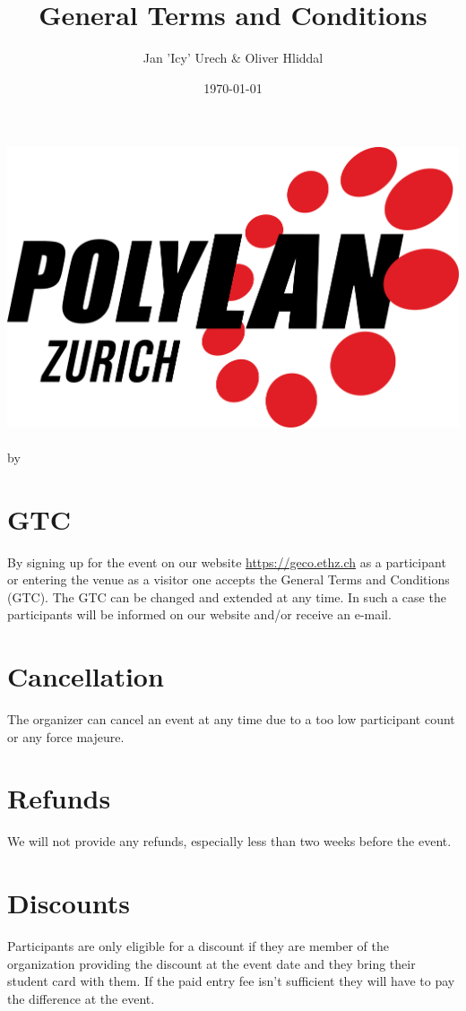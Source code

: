 \documentclass{article}
\title{General Terms and Conditions}
\author{Jan 'Icy' Urech \& Oliver Hliddal}
\date{\today}
\begin{document}
\makeatletter
\begin{titlepage}
\centering
\includegraphics[scale=0.075]{img/PolyLAN_Zurich_black.png}\\
\LARGE \@title\\ \normalsize by \@author\\ \@date
\end{titlepage}
\makeatother


\clearpage

\tableofcontents
\clearpage


\section{GTC}
By signing up for the event on our website \url{https://geco.ethz.ch} as a participant or entering the venue as a visitor one accepts the General Terms and Conditions (GTC).
The GTC can be changed and extended at any time. In such a case the participants will be informed on our website and/or receive an e-mail.


\section{Cancellation}
The organizer can cancel an event at any time due to a too low participant count or any force majeure.

\section{Refunds}
We will not provide any refunds, especially less than two weeks before the event.

\section{Discounts}
Participants are only eligible for a discount if they are member of the organization providing the discount at the event date and they bring their student card with them. If the paid entry fee isn't sufficient they will have to pay the difference at the event.
\end{document}
